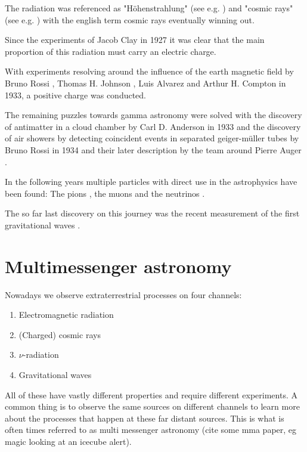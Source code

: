 The radiation was referenced as "Höhenstrahlung" 
(see e.g. \cite{myssowsky1926versuche}) 
and "cosmic rays" (see e.g. \cite{millikan1928origin}) with 
the english term cosmic rays eventually winning out.


Since the experiments of Jacob Clay in 1927 
\cite{clay1927penetrating}
it was clear that the main proportion of 
this radiation must carry an electric charge.

With experiments resolving around the influence of the earth magnetic 
field by 
Bruno Rossi \cite{Rossi1933},
Thomas H. Johnson \cite{PhysRev.43.834},
Luis Alvarez and Arthur H. Compton \cite{PhysRev.43.835}
in 1933,
a positive charge was conducted.

The remaining puzzles towards gamma astronomy were 
solved with the discovery of antimatter in a cloud chamber
by Carl D. Anderson in 1933
\cite{PhysRev.43.491}
and the discovery of air showers by detecting coincident 
events in separated geiger-müller tubes by 
Bruno Rossi in 1934
\cite{PhysRev.45.212}
and their later description by
the team around Pierre Auger 
\cite{RevModPhys.11.288}.

In the following years multiple particles with direct use in the 
astrophysics have been found:
The pions \cite{LATTES1947}, the muons \cite{PhysRev.52.1003}
and the neutrinos \cite{Cowan103}.

The so far last discovery on this journey
was the recent measurement of the first gravitational 
waves \cite{PhysRevLett.118.221101}.

\section{Multimessenger astronomy}

Nowadays we observe extraterrestrial processes on four channels: 
\begin{enumerate}
	\item Electromagnetic radiation
	\item (Charged) cosmic rays
	\item $\nu$-radiation
	\item Gravitational waves
\end{enumerate}

All of these have vastly different properties and require different experiments.
A common thing is to observe the same sources 
on different channels to learn more about the processes that happen at 
these far distant sources. This is what is often times 
referred to as multi messenger astronomy (cite some mma paper, eg magic looking at an icecube alert).

